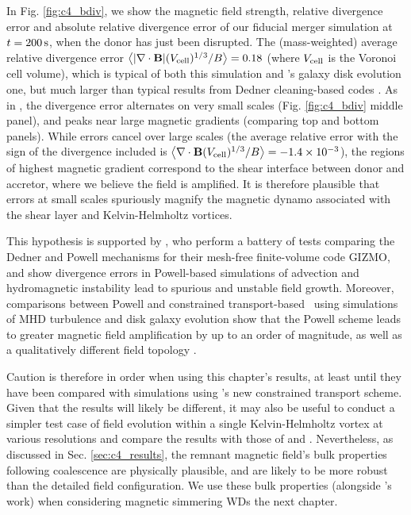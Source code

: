 In Fig. \ref{fig:c4_bdiv}, we show the magnetic field strength, relative divergence error and absolute relative divergence error of our fiducial merger simulation at $t = 200\,\mathrm{s}$, when the donor has just been disrupted.  The (mass-weighted) average relative divergence error $\left\langle|\mathbf{\nabla\cdot B}|(V_\mathrm{cell})^{1/3}/B\right\rangle = 0.18$ (where $V_\mathrm{cell}$ is the Voronoi cell volume), which is typical of both this simulation and \cite{pakms13}'s galaxy disk evolution one, but much larger than typical results from Dedner cleaning-based codes \citep{tric15, hopkr16}.  As in \cite{pakms13}, the divergence error alternates on very small scales (Fig. \ref{fig:c4_bdiv} middle panel), and peaks near large magnetic gradients (comparing top and bottom panels).  While errors cancel over large scales (the average relative error with the sign of the divergence included is $\left\langle\mathbf{\nabla\cdot B}(V_\mathrm{cell})^{1/3}/B\right\rangle = -1.4\times10^{-3}$), the regions of highest magnetic gradient correspond to the shear interface between donor and accretor, where we believe the field is amplified.  It is therefore plausible that errors at small scales spuriously magnify the magnetic dynamo associated with the shear layer and Kelvin-Helmholtz vortices.  

This hypothesis is supported by \cite{hopkr16}, who perform a battery of tests comparing the Dedner and Powell mechanisms for their mesh-free finite-volume code \textsc{GIZMO}, and show divergence errors in Powell-based simulations of advection and hydromagnetic instability lead to spurious and unstable field growth.  Moreover, comparisons between Powell and constrained transport-based \arepo\ using simulations of MHD turbulence and disk galaxy evolution show that the Powell scheme leads to greater magnetic field amplification by up to an order of magnitude, as well as a qualitatively different field topology \citep{mocz+16}.



Caution is therefore in order when using this chapter's results, at least until they have been compared with simulations using \arepo's new constrained transport scheme.  Given that the results will likely be different, it may also be useful to conduct a simpler test case of field evolution within a single Kelvin-Helmholtz vortex at various resolutions and compare the results with those of \cite{oberam10} and \cite{zrakm13}.  Nevertheless, as discussed in Sec. \ref{sec:c4_results}, the remnant magnetic field's bulk properties following coalescence are physically plausible, and are likely to be more robust than the detailed field configuration.  We use these bulk properties (alongside \cite{ji+13}'s work) when considering magnetic simmering WDs the next chapter.

